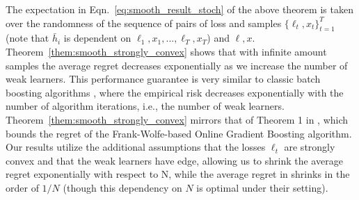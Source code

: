 The expectation in Eqn.~\ref{eq:smooth_result_stoch} of the above theorem is taken over the randomness of the sequence of pairs of loss and samples $\{\ell_t, x_t\}_{t=1}^T$ (note that $\bar{h}_i$ is dependent on $\ell_1,x_1,...,\ell_{T},x_{T}$) and $\ell, x$. 
Theorem~\ref{them:smooth_strongly_convex} shows that with infinite amount samples the average regret decreases exponentially as we increase the number of weak learners. 
This performance guarantee is very similar to classic batch boosting algorithms \citep{schapire2012boosting,grubb2011generalized}, where the empirical risk decreases exponentially with the number of algorithm iterations, i.e., the number of weak learners. 
Theorem~\ref{them:smooth_strongly_convex} mirrors that of Theorem 1 in \citep{beygelzimer2015online}, which bounds the regret of the Frank-Wolfe-based Online Gradient Boosting algorithm. Our results utilize the additional assumptions that the losses $\ell_t$ are strongly convex and that the weak learners have edge, allowing us to shrink the average regret exponentially with respect to N, while the average regret in \citep{beygelzimer2015online} shrinks in the order of $1/N$ (though this dependency on $N$ is optimal under their setting).






